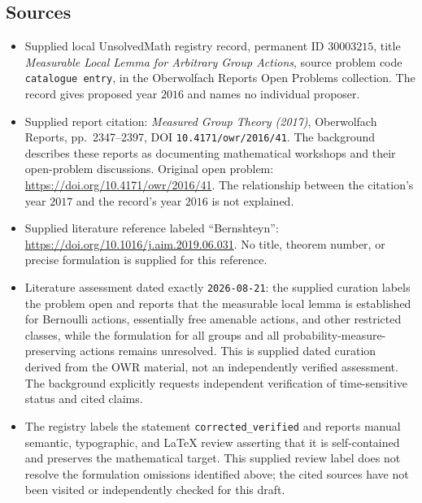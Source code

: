 \documentclass[11pt]{article}
\begin{document}
\subsection{Sources}
\begin{itemize}
\item Supplied local UnsolvedMath registry record, permanent ID \(30003215\), title \emph{Measurable Local Lemma for Arbitrary Group Actions}, source problem code \texttt{catalogue entry}, in the Oberwolfach Reports Open Problems collection. The record gives proposed year \(2016\) and names no individual proposer.
\item Supplied report citation: \emph{Measured Group Theory (2017)}, Oberwolfach Reports, pp.\ 2347--2397, DOI \texttt{10.4171/owr/2016/41}. The background describes these reports as documenting mathematical workshops and their open-problem discussions. Original open problem: \url{https://doi.org/10.4171/owr/2016/41}. The relationship between the citation's year \(2017\) and the record's year \(2016\) is not explained.
\item Supplied literature reference labeled ``Bernshteyn'': \url{https://doi.org/10.1016/j.aim.2019.06.031}. No title, theorem number, or precise formulation is supplied for this reference.
\item Literature assessment dated exactly \texttt{2026-08-21}: the supplied curation labels the problem open and reports that the measurable local lemma is established for Bernoulli actions, essentially free amenable actions, and other restricted classes, while the formulation for all groups and all probability-measure-preserving actions remains unresolved. This is supplied dated curation derived from the OWR material, not an independently verified assessment. The background explicitly requests independent verification of time-sensitive status and cited claims.
\item The registry labels the statement \texttt{corrected\_verified} and reports manual semantic, typographic, and LaTeX review asserting that it is self-contained and preserves the mathematical target. This supplied review label does not resolve the formulation omissions identified above; the cited sources have not been visited or independently checked for this draft.
\end{itemize}
\end{document}
